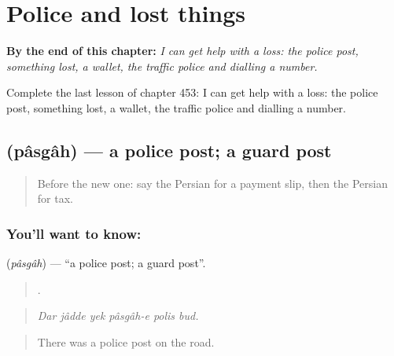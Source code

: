 
\chapter{Police and lost things}
\label{ch:fa-police-and-lost-things}

\begin{chapteropening}
\textbf{By the end of this chapter:} \emph{I can get help with a loss: the police post, something lost, a wallet, the traffic police and dialling a number.}

Complete the last lesson of chapter 453: I can get help with a loss: the police post, something lost, a wallet, the traffic police and dialling a number.
\end{chapteropening}

\section[\texorpdfstring{\fa{پاسگاه} (pâsgâh)}{پاسگاه (pâsgâh)}]{ (pâsgâh) — a police post; a guard post}

\label{lesson:FA-C453-pasgah}



\begin{quote}
Before the new one: say the Persian for a payment slip, then the Persian for tax.
\end{quote}

\subsection*{You'll want to know: }
\textbf{} (\emph{pâsgâh}) — \textquotedblleft{}a police post; a guard post\textquotedblright{}.

\begin{quote}
     .
\end{quote}

\begin{quote}
\emph{Dar jâdde yek pâsgâh-e polis bud.}
\end{quote}

\begin{quote}
There was a police post on the road.
\end{quote}

